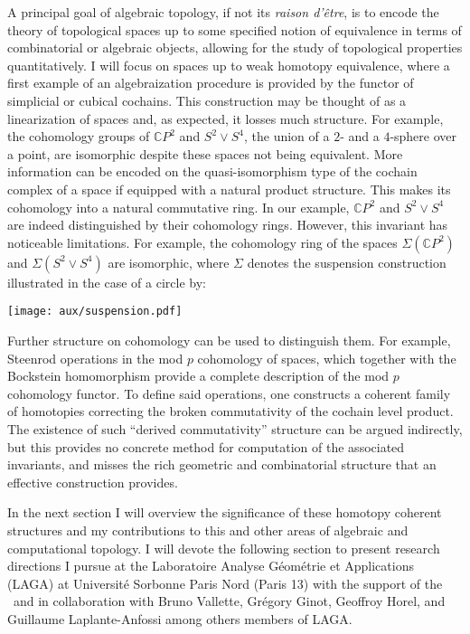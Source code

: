 A principal goal of algebraic topology, if not its \emph{raison d'\^{e}tre}, is to encode the theory of topological spaces up to some specified notion of equivalence in terms of combinatorial or algebraic objects, allowing for the study of topological properties quantitatively.
I will focus on spaces up to weak homotopy equivalence, where a first example of an algebraization procedure is provided by the functor of simplicial or cubical cochains.
This construction may be thought of as a linearization of spaces and, as expected, it losses much structure.
For example, the cohomology groups of $\mathbb{C} P^2$ and $S^2 \vee S^4$, the union of a $2$- and a $4$-sphere over a point, are isomorphic despite these spaces not being equivalent.
More information can be encoded on the quasi-isomorphism type of the cochain complex of a space if equipped with a natural product structure.
This makes its cohomology into a natural commutative ring.
In our example, $\mathbb{C} P^2$ and $S^2 \vee S^4$ are indeed distinguished by their cohomology rings.
However, this invariant has noticeable limitations.
For example, the cohomology ring of the spaces $\Sigma(\mathbb{C} P^2)$ and $\Sigma(S^2 \vee S^4)$ are isomorphic, where $\Sigma$ denotes the suspension construction illustrated in the case of a circle by:
\begin{center}
	\texttt{[image: aux/suspension.pdf]}
\end{center}
Further structure on cohomology can be used to distinguish them.
For example, Steenrod operations in the mod $p$ cohomology of spaces, which together with the Bockstein homomorphism provide a complete description of the mod $p$ cohomology functor.
To define said operations, one constructs a coherent family of homotopies correcting the broken commutativity of the cochain level product.
The existence of such ``derived commutativity'' structure can be argued indirectly, but this provides no concrete method for computation of the associated invariants, and misses the rich geometric and combinatorial structure that an effective construction provides.

In the next section I will overview the significance of these homotopy coherent structures and my contributions to this and other areas of algebraic and computational topology.
I will devote the following section to present research directions I pursue at the Laboratoire Analyse G\'eom\'etrie et Applications (LAGA) at Universit\'e Sorbonne Paris Nord (Paris 13) with the support of the \grantName\ and in collaboration with Bruno Vallette, Gr\'egory Ginot, Geoffroy Horel, and Guillaume Laplante-Anfossi among others members of LAGA.
